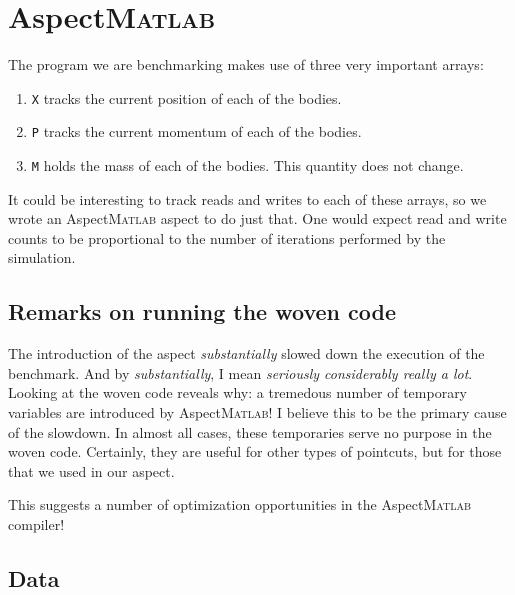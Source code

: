 \documentclass[11pt,letterpaper]{article}
\newcommand{\matlab}{\textsc{Matlab}}
\begin{document}
\section{Aspect\matlab{}}

The program we are benchmarking makes use of three very important arrays:
\begin{enumerate}
    \item
        \texttt{X} tracks the current position of each of the bodies.
    \item
        \texttt{P} tracks the current momentum of each of the bodies.
    \item
        \texttt{M} holds the mass of each of the bodies. This quantity does not
        change.
\end{enumerate}

It could be interesting to track reads and writes to each of these arrays, so
we wrote an Aspect\matlab{} aspect to do just that. One would expect read and
write counts to be proportional to the number of iterations performed by the
simulation.

\subsection{Remarks on running the woven code}

The introduction of the aspect \emph{substantially} slowed down the execution
of the benchmark. And by \emph{substantially}, I mean \emph{seriously
considerably really a lot}. Looking at the woven code reveals why: a tremedous
number of temporary variables are introduced by Aspect\matlab{}! I believe this
to be the primary cause of the slowdown. In almost all cases, these temporaries
serve no purpose in the woven code. Certainly, they are useful for other types
of pointcuts, but for those that we used in our aspect.

This suggests a number of optimization opportunities in the Aspect\matlab{}
compiler!

\subsection{Data}
\end{document}

